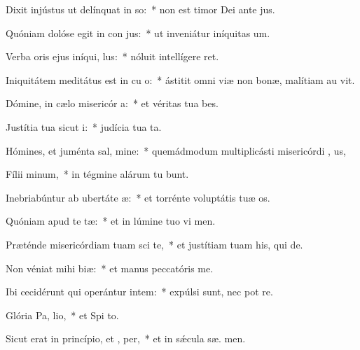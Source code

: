 \item Dixit injústus ut delínquat in so:~* non est timor Dei ante  jus.
\item Quóniam dolóse egit in con jus:~* ut inveniátur iníquitas   um.
\item Verba oris ejus iníqui,  lus:~* nóluit intellígere   ret.
\item Iniquitátem meditátus est in cu o:~* ástitit omni viæ non bonæ, malítiam au  vit.
\item Dómine, in cælo misericór a:~* et véritas tua   bes.
\item Justítia tua sicut  i:~* judícia tua  ta.
\item Hómines, et juménta sal, mine:~* quemádmodum multiplicásti misericórdi , us,
\item Fílii  minum,~* in tégmine alárum tu bunt.
\item Inebriabúntur ab ubertáte  æ:~* et torrénte voluptátis tuæ  os.
\item Quóniam apud te   tæ:~* et in lúmine tuo vi men.
\item Præténde misericórdiam tuam sci te,~* et justítiam tuam his, qui   de.
\item Non véniat mihi  biæ:~* et manus peccatóris   me.
\item Ibi cecidérunt qui operántur intem:~* expúlsi sunt, nec pot re.
\item Glória Pa,  lio,~* et Spi to.
\item Sicut erat in princípio, et ,  per,~* et in sǽcula sæ. men.

